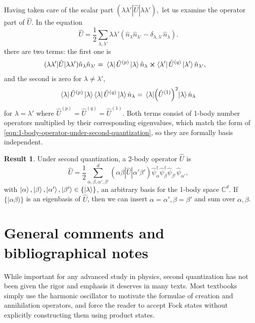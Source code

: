 \documentclass{article}
\theoremstyle{definition}
\newtheorem{res}{Result}[section]
\theoremstyle{plain}
\numberwithin{equation}{section}
\begin{document}
Having taken care of the scalar part
$
    (\lambda \lambda'
    |\hat{U}|
    \lambda \lambda'),
$ 
let us examine the operator part of $\hat{U}$. In the equation
\[
    \hat{U}=
    \frac{1}{2}
    \sum_{\lambda,\lambda'}
    \lambda \lambda'
    \left( \hat{n}_{\lambda}\hat{n}_{\lambda'}
    -
    \delta_{\lambda,\lambda'}
    \hat{n}_{\lambda} \right) .
\]
there are two terms: the first one is 
\begin{align*}
    (\lambda \lambda'
    |\hat{U}|
    \lambda \lambda')
    \hat{n}_{\lambda} \hat{n}_{\lambda'}
    =&\ 
    \bra{\lambda} \hat{U}^{(p)} \ket{\lambda}
    \hat{n}_{\lambda}
    \cross 
    \bra{\lambda'} \hat{U}^{(q)} \ket{\lambda'}
    \hat{n}_{\lambda'},
\end{align*}
and the second is zero for $\lambda \neq \lambda'$, 
\[
    \bra{\lambda} \hat{U}^{(p)} \ket{\lambda}
    \bra{\lambda} \hat{U}^{(q)} \ket{\lambda}
    \hat{n}_{\lambda}
    =
    \expval{\left( \hat{U}^{(1)} \right)^{2}}{\lambda}
    \hat{n}_{\lambda}
\]
for $\lambda = \lambda'$ where 
$\hat{U}^{(p)}=\hat{U}^{(q)}=\hat{U}^{(1)}$. 
Both terms consist of 
1-body number operators multiplied by 
their corresponding eigenvalues, which 
match the form of 
\cref{eqn:1-body-operator-under-second-quantization}, 
so they are formally basis independent. 

\begin{graybox}
    \begin{res}
        Under second quantization, 
        a 2-body operator $\hat{U}$ is 
        \begin{equation}
            \hat{U}
            =
            \frac{1}{2}
            \sum_{\alpha,\beta,\alpha',\beta'}^{d}
            (\alpha \beta
            |\hat{U}|
            \alpha' \beta')
            \hat{\psi}^{\dagger}_{\alpha}
            \hat{\psi}^{\dagger}_{\beta}
            \hat{\psi}_{\beta'}
            \hat{\psi}_{\alpha'},
        \end{equation}
        with 
        $\ket{\alpha},\ket{\beta}, 
        \ket{\alpha'}, \ket{\beta'}
        \in \{\ket{\lambda}\}$, 
        an arbitrary basis 
        for the 1-body space $\mathbb{C}^{d}$. 
        If 
        $\{|\alpha \beta)\}$ 
        is an eigenbasis of $\hat{U}$, then 
        we can insert 
        $\alpha = \alpha', \beta = \beta'$ 
        and sum over $\alpha, \beta$.
    \end{res}
\end{graybox}

\section{General comments and bibliographical notes}
While important for any advanced study in physics, 
second quantization has not been given the rigor and 
emphasis it deserves in many texts. Most textbooks simply 
use the harmonic oscillator to motivate the formulae of 
creation and annihilation operators, and force the reader 
to accept Fock states without explicitly constructing them 
using product states.
\end{document}

